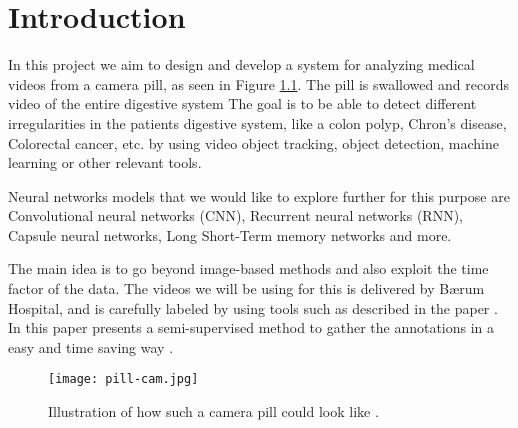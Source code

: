 \documentclass[thesis.tex]{subfiles}
\begin{document}
\chapter{Introduction}


In this project we aim to design and develop a system for analyzing medical videos from a camera pill, as seen in Figure \ref{fig:pill-cam}. The pill is swallowed and records video of the entire digestive system The goal is to be able to detect different irregularities in the patients digestive system, like a colon polyp, Chron's disease, Colorectal cancer, etc. by using video object tracking, object detection, machine learning or other relevant tools.

Neural networks models that we would like to explore further for this purpose are Convolutional neural networks (CNN), Recurrent neural networks (RNN), Capsule neural networks, Long Short-Term memory networks and more.

The main idea is to go beyond image-based methods and also exploit the time factor of the data. 
The videos we will be using for this is delivered by Bærum Hospital, and is carefully labeled by using tools such as described in the paper . In this paper \citeauthor*{ExpertDriven15} presents a semi-supervised method to gather the annotations in a easy and time saving way \cite{ExpertDriven15}. 

\begin{figure}[H] %
  \begin{center}
    \texttt{[image: pill-cam.jpg]}
    \caption{Illustration of how such a camera pill could look like \cite{PillCamCamera}.}
    \label{fig:pill-cam}
  \end{center}
\end{figure}
\end{document}
